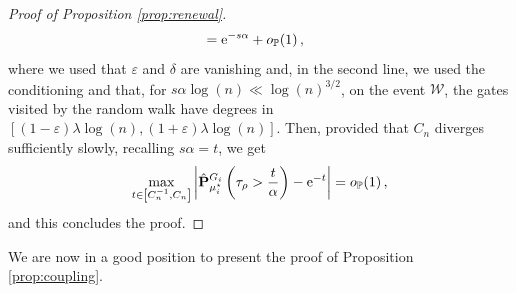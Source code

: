 \documentclass[11pt,oneside]{amsart}
\numberwithin{equation}{section}  %
\theoremstyle{plain}
\newcommand{\eps}{\varepsilon}
\newcommand{\p}{\mathbb{P}}
\newcommand{\op}{o_{\p}}
\newcommand{\quench}{\mathbf{P}}
\newcommand{\gates}{\mathcal{G}}
\newcommand{\muqs}{\mu^\star_i}
\begin{document}
\begin{proof}[Proof of Proposition \ref{prop:renewal}]
\begin{equation}
\begin{split}
			&={\rm e}^{-s\alpha}+\op(1)\,,
		\end{split} 
	\end{equation}
    where we used that $\eps$ and $\delta$ are vanishing and, in the second line, we used the conditioning and that, for 
    $s \alpha \log(n) 
    \ll \log(n)^{3/2}$, on the event $\mathcal{W}$, the gates visited by the random walk have degrees in $[(1-\eps)\lambda\log(n),(1+\eps)\lambda \log(n)]$.
	Then, provided that $C_n$ diverges sufficiently slowly, 
        recalling $s\alpha=t$, we get
\begin{equation}
	 	\max_{t\in\left[C_n^{-1}, {C_n}\right]}
         \left|\hat{\quench}^{G_i}_{\muqs}\left(\tau_\rho> \frac{t}\alpha\right)- {\rm e}^{-t}\right|=\op(1)\,,
\end{equation}
and this concludes the proof.
\end{proof}

\newcommand{\muinh}{\hat{\mu}^{\rm in}_{\gates_i}}

We are now in a good position to present the proof of Proposition \ref{prop:coupling}.
\end{document}
